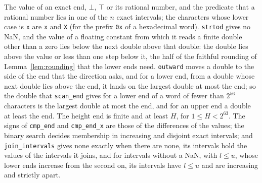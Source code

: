 \begin{lemma}\label{lem:cliNumbers}
  \leanok
  The value of an exact end, $\bot$, $\top$ or its rational number, and the predicate that a
  rational number lies in one of the $n$ exact intervals; the characters whose lower case is
  \verb|x| are \verb|x| and \verb|X| (for the prefix \verb|0x| of a hexadecimal word). \verb|strtod|
  gives no NaN, and the value of a floating constant from which it reads a finite double other than
  a zero lies below the next double above that double: the double lies above the value or less than
  one step below it, the half of the faithful rounding of Lemma~\ref{lem:rounding} that the lower
  ends need. \verb|outward| moves a double to the side of the end that the direction asks, and for a
  lower end, from a double whose next double lies above the end, it lands on the largest double at
  most the end; so the double that \verb|scan_end| gives for a lower end of a word of fewer than
  $2^{56}$ characters is the largest double at most the end, and for an upper end a double at least
  the end. The height end is finite and at least $H$, for $1 \le H < 2^{63}$. The signs of
  \verb|cmp_end| and \verb|cmp_end_x| are those of the differences of the values; the binary search
  decides membership in increasing and disjoint exact intervals; and \verb|join_intervals| gives
  none exactly when there are none, its intervals hold the values of the intervals it joins, and for
  intervals without a NaN, with $l \le u$, whose lower ends increase from the second on, its
  intervals have $l \le u$ and are increasing and strictly apart.
\end{lemma}

